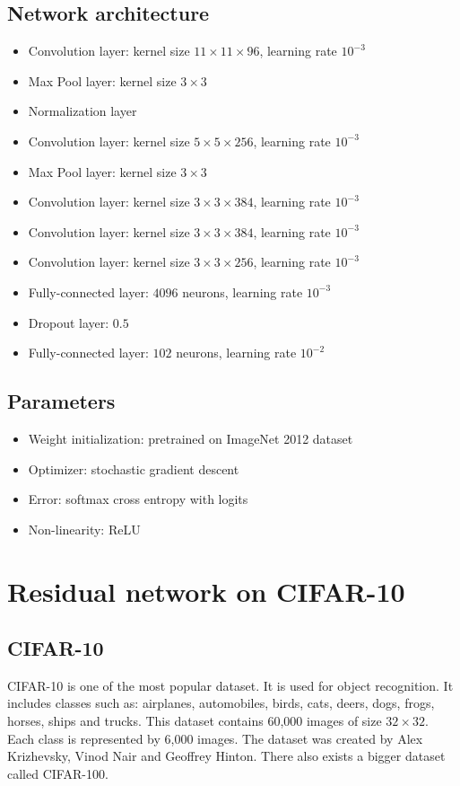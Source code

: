 \documentclass[licencjacka]{pracamgr}
\begin{document}
		\subsection{Network architecture}
			\begin{itemize}
			\item Convolution layer: kernel size $11 \times 11 \times 96$, learning rate $10^{-3}$
			\item Max Pool layer: kernel size $3 \times 3$
			\item Normalization layer
			\item Convolution layer: kernel size $5 \times 5 \times 256$, learning rate $10^{-3}$
			\item Max Pool layer: kernel size $3 \times 3$
			\item Convolution layer: kernel size $3 \times 3 \times 384$, learning rate $10^{-3}$
			\item Convolution layer: kernel size $3 \times 3 \times 384$, learning rate $10^{-3}$
			\item Convolution layer: kernel size $3 \times 3 \times 256$, learning rate $10^{-3}$
			\item Fully-connected layer: $4096$ neurons, learning rate $10^{-3}$
			\item Dropout layer: $0.5$
			\item Fully-connected layer: $102$ neurons, learning rate $10^{-2}$
			\end{itemize}
		\subsection{Parameters}
			\begin{itemize}
			\item Weight initialization: pretrained on ImageNet 2012 dataset
			\item Optimizer: stochastic gradient descent
			\item Error: softmax cross entropy with logits
			\item Non-linearity: ReLU
			\end{itemize}
	\section{Residual network on CIFAR-10}
		\subsection{CIFAR-10}
		CIFAR-10 is one of the most popular dataset. It is used for object recognition. It includes classes such as: airplanes, automobiles, birds, cats, deers, dogs, frogs, horses, ships and trucks. This dataset contains 60,000 images of size $32\times32$. Each class is represented by 6,000 images. The dataset was created by Alex Krizhevsky, Vinod Nair and Geoffrey Hinton. There also exists a bigger dataset called CIFAR-100.
\end{document}
